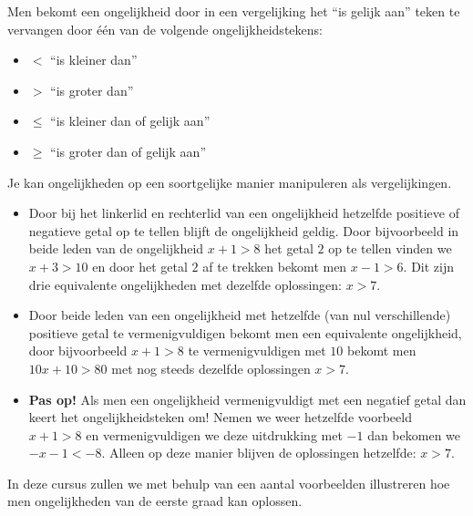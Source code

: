 Men bekomt een ongelijkheid door in een vergelijking het ``is gelijk aan'' teken te vervangen door \'{e}\'{e}n van de volgende ongelijkheidstekens:
\begin{itemize}
\item $ < $ ``is kleiner dan''
\item $ > $  ``is groter dan''
\item $ \leq $ ``is kleiner dan of gelijk aan''
\item $ \geq $ ``is groter dan of gelijk aan''
\end{itemize}

Je kan ongelijkheden op een soortgelijke manier manipuleren als vergelijkingen.
\begin{itemize}
\item Door bij het linkerlid en rechterlid van een ongelijkheid hetzelfde positieve of negatieve getal op te tellen blijft de ongelijkheid geldig. Door bijvoorbeeld in beide leden van de ongelijkheid $x+1>8$ het getal $2$ op te tellen vinden we $x+3>10$ en door het getal $2$ af te trekken bekomt men $x-1>6$. Dit zijn drie equivalente ongelijkheden met dezelfde oplossingen: $x>7$.
\item Door beide leden van een ongelijkheid met hetzelfde (van nul verschillende) positieve getal te vermenigvuldigen bekomt men een equivalente ongelijkheid, door bijvoorbeeld $x+1>8$ te vermenigvuldigen met $10$ bekomt men $10x+10>80$ met nog steeds dezelfde oplossingen $x>7$.
\item {\bf Pas op!} Als men een ongelijkheid vermenigvuldigt met een negatief getal dan keert het ongelijkheidsteken om! Nemen we weer hetzelfde voorbeeld $x+1>8$ en vermenigvuldigen we deze uitdrukking met $-1$ dan bekomen we $-x-1<-8$. Alleen op deze manier blijven de oplossingen hetzelfde: $x>7$.
\end{itemize}

In deze cursus zullen we met behulp van een aantal voorbeelden illustreren hoe men ongelijkheden van de eerste graad kan oplossen.\\

